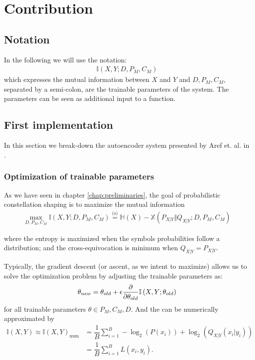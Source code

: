 \chapter{Contribution}\label{chap:contribution}
\section{Notation}
In the following we will use the notation:
\begin{align*}
	\mathbb{I} \left(X , Y; D, P_M, C_M \right)
\end{align*}
which expresses the mutual information between $X$ and $Y$ and $D, P_M, C_M$, separated by a semi-colon, are the trainable parameters of the system. The parameters can be seen as additional input to a function.
\section{First implementation}
In this section we break-down the autoencoder system presented by Aref et. al. in \cite{Aref}.
\subsection{Optimization of trainable parameters}
As we have seen in chapter \ref{chap:preliminaries}, the goal of probabilistic constellation shaping is to maximize the mutual information
\begin{align}
	 \max_{D, P_M, C_M} \mathbb{I} \left(X , Y ; D, P_M, C_M \right) \overset{\text{(a)}}{=} \mathbb{H}(X) - \mathbb{X}(P_{X|Y} \Vert Q_{X|Y} ; D, P_M, C_M)
\end{align}

where the entropy is maximized when the symbols probabilities follow a  distribution; and the cross-equivocation is minimum when $Q_{X|Y} = P_{X|Y}$.

Typically, the gradient descent (or ascent, as we intent to maximize) allows us to solve the optimization problem by adjusting the trainable parameters as:
\begin{align}
	\theta_{new} = \theta_{old} + \epsilon \pdv{\theta_{old}} \mathbb{I} \left(X , Y ; \theta_{old} \right)
\end{align}
for all trainable parameters $\theta \in P_M, C_M, D$. And the  can be numerically approximated by
\begin{align}
	\mathbb{I} \left(X , Y\right) \approx \mathbb{I} \left(X , Y\right)_{\text{num}} &= \dfrac{1}{B} \sum \limits_{i = 1}^{B} - \log_2(P(x_i)) + \log_2(Q_{X|Y}(x_i|y_i))\\
	&= \dfrac{1}{B} \sum \limits_{i = 1}^{B} L(x_i, y_i).
\end{align}

